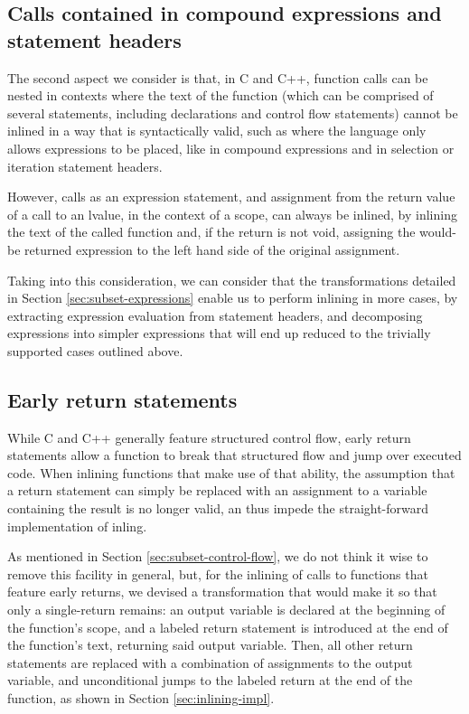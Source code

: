 \subsection{Calls contained in compound expressions and statement headers}

The second aspect we consider is that, in C and C++, function calls can be nested in contexts where the text of the function (which can be comprised of several statements, including declarations and control flow statements) cannot be inlined in a way that is syntactically valid, such as where the language only allows expressions to be placed, like in compound expressions and in selection or iteration statement headers.

However, calls as an expression statement, and assignment from the return value of a call to an lvalue, in the context of a scope, can always be inlined, by inlining the text of the called function and, if the return is not void, assigning the would-be returned expression to the left hand side of the original assignment.

Taking into this consideration, we can consider that the transformations detailed in Section \ref{sec:subset-expressions} enable us to perform inlining in more cases, by extracting expression evaluation from statement headers, and decomposing expressions into simpler expressions that will end up reduced to the trivially supported cases outlined above.

\subsection{Early return statements}

While C and C++ generally feature structured control flow, early return statements allow a function to break that structured flow and jump over executed code. When inlining functions that make use of that ability, the assumption that a return statement can simply be replaced with an assignment to a variable containing the result is no longer valid, an thus impede the straight-forward implementation of inling.

As mentioned in Section \ref{sec:subset-control-flow}, we do not think it wise to remove this facility in general, but, for the inlining of calls to functions that feature early returns, we devised a transformation that would make it so that only a single-return remains: an output variable is declared at the beginning of the function's scope, and a labeled return statement is introduced at the end of the function's text, returning said output variable. Then, all other return statements are replaced with a combination of assignments to the output variable, and unconditional jumps to the labeled return at the end of the function, as shown in Section \ref{sec:inlining-impl}.

